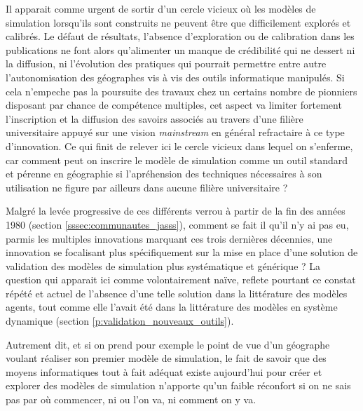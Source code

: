 Il apparait comme urgent de sortir d'un cercle vicieux où les modèles de simulation lorsqu'ils sont construits ne peuvent être que difficilement explorés et calibrés. Le défaut de résultats, l'absence d'exploration ou de calibration dans les publications ne font alors qu'alimenter un manque de crédibilité qui ne dessert ni la diffusion, ni l'évolution des pratiques qui pourrait permettre entre autre l'autonomisation des géographes vis à vis des outils informatique manipulés. Si cela n'empeche pas la poursuite des travaux chez un certains nombre de pionniers disposant par chance de compétence multiples, cet aspect va limiter fortement l'inscription et la diffusion des savoirs associés au travers d'une filière universitaire appuyé sur une vision \textit{mainstream} en général refractaire à ce type d'innovation. Ce qui finit de relever ici le cercle vicieux dans lequel on s'enferme, car comment peut on inscrire le modèle de simulation comme un outil standard et pérenne en géographie si l'apréhension des techniques nécessaires à son utilisation ne figure par ailleurs dans aucune filière universitaire ? 

Malgré la levée progressive de ces différents verrou à partir de la fin des années 1980 (section \ref{sssec:communautes_jasss}), comment se fait il qu'il n'y ai pas eu, parmis les multiples innovations marquant ces trois dernières décennies, une innovation se focalisant plus spécifiquement sur la mise en place d'une solution de validation des modèles de simulation plus systématique et générique ? La question qui apparait ici comme volontairement naïve, reflete pourtant ce constat répété et actuel de l'absence d'une telle solution dans la littérature des modèles agents, tout comme elle l'avait été dans la littérature des modèles en système dynamique (section \ref{p:validation_nouveaux_outils}).

Autrement dit, et si on prend pour exemple le point de vue d'un géographe voulant réaliser son premier modèle de simulation, le fait de savoir que des moyens informatiques tout à fait adéquat existe aujourd'hui pour créer et explorer des modèles de simulation n'apporte qu'un faible réconfort si on ne sais pas par où commencer, ni ou l'on va, ni comment on y va.



